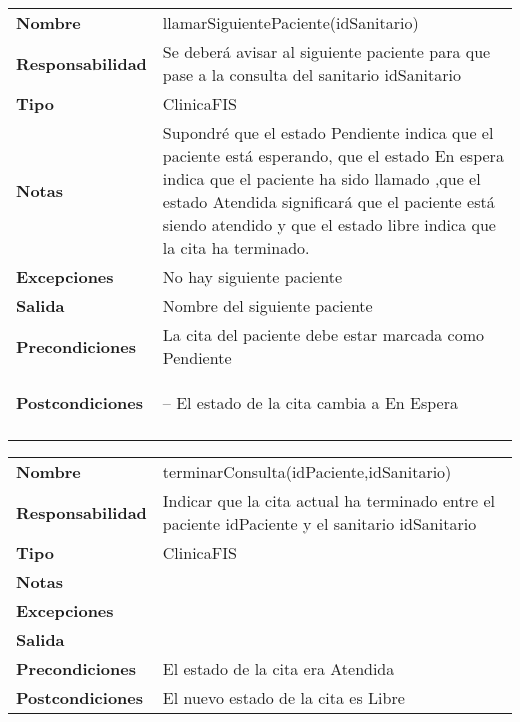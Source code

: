 



\begin{table}[H]
\centering
	  \begin{tabularx}{\textwidth}{l|X}
    \textbf{Nombre}        & llamarSiguientePaciente(idSanitario) \\ 
    \textbf{Responsabilidad}  &  Se deberá avisar al siguiente paciente para que pase a la consulta del sanitario idSanitario \\ 
    \textbf{Tipo}       & ClinicaFIS  \\ 
    \textbf{Notas}        & Supondré que el estado Pendiente indica que el paciente está esperando, que el estado En espera indica que el paciente ha sido llamado ,que el estado Atendida significará que el paciente está siendo atendido y que el estado libre indica que la cita ha terminado.  \\ 
    \textbf{Excepciones}    & No hay siguiente paciente \\ 
    \textbf{Salida}        & Nombre del siguiente paciente\\ 
    \textbf{Precondiciones}    & La cita del paciente debe estar marcada como Pendiente \\ 
    \textbf{Postcondiciones}  &
    \begin{itemizenomargins}
   \item[--] El estado de la cita cambia a En Espera
   \end{itemizenomargins} \\ \\
  \end{tabularx}

\end{table}


\begin{table}[H]
\centering
	  \begin{tabularx}{\textwidth}{l|X}
    \textbf{Nombre}        & terminarConsulta(idPaciente,idSanitario) \\ 
    \textbf{Responsabilidad}  & Indicar que la cita actual ha terminado entre el paciente idPaciente y el sanitario idSanitario \\ 
    \textbf{Tipo}        &  ClinicaFIS\\ 
    \textbf{Notas}        &  \\ 
    \textbf{Excepciones}    &  \\ 
    \textbf{Salida}        &  \\ 
    \textbf{Precondiciones}    & El estado de la cita era Atendida  \\ 
    \textbf{Postcondiciones}  & El nuevo estado de la cita es Libre\\ 
  \end{tabularx}

\end{table}

